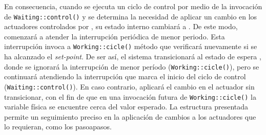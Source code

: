 \begin{figure}[H]
\begin{center}
{
}
\end{center}
\end{figure}

\newpage
{}

En consecuencia, cuando se ejecuta un ciclo de control por medio de la invocación de \verb|Waiting::control()| y se determina la necesidad de aplicar un cambio en los actuadores controlados por \ControlSeguimiento, su estado interno cambiará a \Working. De este modo, comenzará a atender la interrupción periódica de menor periodo. Esta interrupción invoca a \verb|Working::cicle()| método que verificará nuevamente si se ha alcanzado el \textit{set-point}. De ser así, el sistema transicionará al estado de espera \Waiting, donde se ignorará la interrupción de menor período (\verb|Working::cicle()|), pero se continuará atendiendo la interrupción que marca el inicio del ciclo de control (\verb|Waiting::control()|). En caso contrario, aplicará el cambio en el actuador sin transicionar, con el fin de que en una invocación futura de \verb|Working::cicle()| la variable física se encuentre cerca del valor esperado. La estructura presentada permite un seguimiento preciso en la aplicación de cambios a los actuadores que lo requieran, como los \glspl{pasoapaso}.

